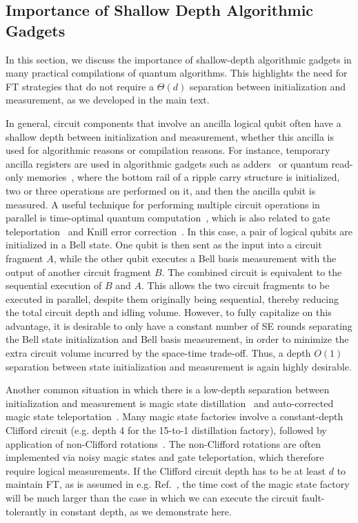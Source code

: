 \subsection{Importance of Shallow Depth Algorithmic Gadgets}
\label{methods:shallow_gadget}
In this section, we discuss the importance of shallow-depth algorithmic gadgets in many practical compilations of quantum algorithms.
%
This highlights the need for FT strategies that do not require a $\Theta(d)$ separation between initialization and measurement, as we developed in the main text.

In general, circuit components that involve an ancilla logical qubit often have a shallow depth between initialization and measurement, whether this ancilla is used for algorithmic reasons or compilation reasons.
%
For instance, temporary ancilla registers are used in algorithmic gadgets such as adders~\cite{gidney2018halving,cuccaro2004new} or quantum read-only memories~\cite{babbush2018encoding}, where the bottom rail of a ripple carry structure is initialized, two or three operations are performed on it, and then the ancilla qubit is measured.
%
A useful technique for performing multiple circuit operations in parallel is time-optimal quantum computation~\cite{fowler2012time,gidney2019how,litinski2022active}, which is also related to gate teleportation~\cite{nielsen2010quantum} and Knill error correction~\cite{knill2004quantum}.
%
In this case, a pair of logical qubits are initialized in a Bell state.
%
One qubit is then sent as the input into a circuit fragment $A$, while the other qubit executes a Bell basis measurement with the output of another circuit fragment $B$.
%
The combined circuit is equivalent to the sequential execution of $B$ and $A$.
%
This allows the two circuit fragments to be executed in parallel, despite them originally being sequential, thereby reducing the total circuit depth and idling volume.
%
However, to fully capitalize on this advantage, it is desirable to only have a constant number of SE rounds separating the Bell state initialization and Bell basis measurement, in order to minimize the extra circuit volume incurred by the space-time trade-off.
%
Thus, a depth $O(1)$ separation between state initialization and measurement is again highly desirable.

Another common situation in which there is a low-depth separation between initialization and measurement is magic state distillation~\cite{bravyi2005universal} and auto-corrected magic state teleportation~\cite{gidney2019flexible}.
%
Many magic state factories involve a constant-depth Clifford circuit  (e.g. depth 4 for the 15-to-1 distillation factory), followed by application of non-Clifford rotations~\cite{bravyi2005universal,beverland2021cost,fowler2012surface,bravyi2012magic}.
%
The non-Clifford rotations are often implemented via noisy magic states and gate teleportation, which therefore require logical measurements.
%
If the Clifford circuit depth has to be at least $d$ to maintain FT, as is assumed in e.g. Ref.~\cite{cai2023looped}, the time cost of the magic state factory will be much larger than the case in which we can execute the circuit fault-tolerantly in constant depth, as we demonstrate here.

